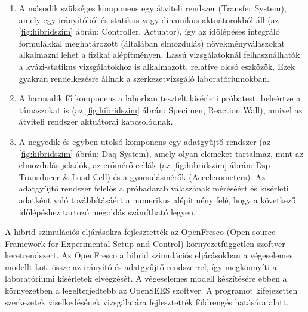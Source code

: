 \begin{enumerate}
\item A második szükséges komponens egy átviteli rendszer (Transfer System), amely egy irányítóból  és statikus vagy dinamikus aktuátorokból áll (az \ref{fig:hibridszim} ábrán: Controller, Actuator), így az időlépéses integráló formulákkal meghatározott (általában elmozdulás) növekményválaszokat alkalmazni lehet  a fizikai alépítményen. Lassú vizsgálatoknál felhasználhatók a kvázi-statikus vizsgálatokhoz is alkalmazott, relatíve olcsó eszközök. Ezek gyakran rendelkezésre állnak a szerkezetvizsgáló laboratóriumokban.

\item A harmadik fő komponens a laborban tesztelt  kísérleti próbatest, beleértve a támaszokat is (az \ref{fig:hibridszim} ábrán: Specimen, Reaction Wall), amivel az átviteli rendszer aktuátorai kapcsolódnak.

\item A negyedik és egyben utolsó komponens egy adatgyűjtő rendszer (az \ref{fig:hibridszim} ábrán: Daq System), amely olyan elemeket tartalmaz, mint az elmozdulás jeladók, az erőmérő cellák (az \ref{fig:hibridszim} ábrán: Dsp Transducer \& Load-Cell) és a gyorsulásmérők (Accelerometers). Az adatgyűjtő rendszer felelős a próbadarab válaszának méréséért és kísérleti adatként való továbbításáért a numerikus alépítmény felé, hogy a következő időlépéshez tartozó megoldás számítható legyen.
\end{enumerate}

 A hibrid szimulációs eljárásokra fejlesztették az OpenFresco (Open-source Framework for Experimental Setup and Control) környezetfüggetlen szoftver keretrendszert. Az OpenFresco  a hibrid szimulációs eljárásokban a végeselemes modellt köti össze az irányító és adatgyűjtő rendszerrel, így megkönnyíti a laboratóriumi kísérletek  elvégzését. A végeselemes modell készítésére ebben a környezetben a legelterjedtebb az OpenSEES szoftver. A programot kifejezetten szerkezetek viselkedésének vizsgálatára fejlesztették földrengés hatására  alatt.



